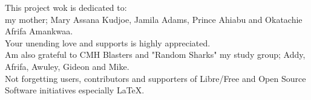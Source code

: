 
\begin{dedication} %
{}
\centering
This project wok is dedicated to:\\
 my mother; Mary Assana Kudjoe, Jamila Adams, Prince Ahiabu and Okatachie Afrifa Amankwaa.\\
Your unending love and supports is highly appreciated.\\

Am also grateful to CMH Blasters and "Random Sharks" my study group; Addy, Afrifa, Awuley, Gideon and Mike. \\

Not forgetting users, contributors and supporters of Libre/Free and Open Source Software initiatives especially \LaTeX.

\end{dedication}

